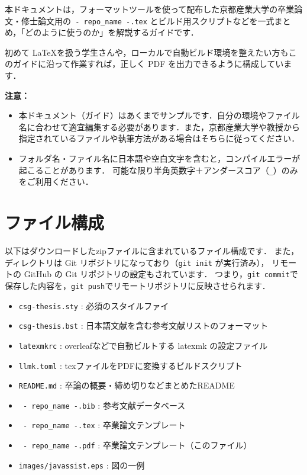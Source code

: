 \documentclass[jlreq,12pt,twoside]{jsreport}
\begin{document}
本ドキュメントは，フォーマットツールを使って配布した京都産業大学の卒業論文・修士論文用の\texttt{ {{- repo_name -}}.tex} とビルド用スクリプトなどを一式まとめ，「どのように使うのか」を解説するガイドです．

初めて \LaTeX を扱う学生さんや，ローカルで自動ビルド環境を整えたい方もこのガイドに沿って作業すれば，正しく PDF を出力できるように構成しています．

\vspace{2zh}
\noindent
\textbf{注意：}
\begin{itemize}
  \item 本ドキュメント（ガイド）はあくまでサンプルです．自分の環境やファイル名に合わせて適宜編集する必要があります．また，京都産業大学や教授から指定されているファイルや執筆方法がある場合はそちらに従ってください．
  \item フォルダ名・ファイル名に日本語や空白文字を含むと，コンパイルエラーが起こることがあります．
        可能な限り半角英数字＋アンダースコア（\texttt{\_}）のみをご利用ください．
\end{itemize}


\chapter{ファイル構成}

以下はダウンロードしたzipファイルに含まれているファイル構成です．
また，ディレクトリは Git リポジトリになっており（\texttt{git init} が実行済み），
リモートの GitHub の Git リポジトリの設定もされています．
つまり，\texttt{git commit}で保存した内容を，\texttt{git push}でリモートリポジトリに反映させられます．

\begin{itemize}
    \item \texttt{csg-thesis.sty} : 必須のスタイルファイ
    \item \texttt{csg-thesis.bst} : 日本語文献を含む参考文献リストのフォーマット
    \item \texttt{latexmkrc} : overleafなどで自動ビルトする latexmk の設定ファイル
    \item \texttt{llmk.toml} : texファイルをPDFに変換するビルドスクリプト
    \item \texttt{README.md} : 卒論の概要・締め切りなどまとめたREADME
    \item \texttt{ {{- repo_name -}}.bib} : 参考文献データベース
    \item \texttt{ {{- repo_name -}}.tex} : 卒業論文テンプレート
    \item \texttt{ {{- repo_name -}}.pdf} :  卒業論文テンプレート（このファイル）
    \item \texttt{images/javassist.eps} : 図の一例
\end{itemize}
\end{document}
